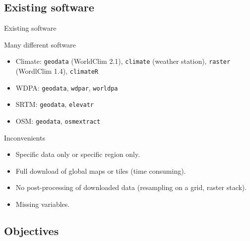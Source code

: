 \documentclass[10pt,table,dvipsnames,compress]{beamer}
\begin{document}
\subsection{Existing software}
\label{sec:org1319f94}

\begin{frame}[label={sec:orgff96910},fragile]{Existing software}
 \begin{block}{Many different software}
\begin{itemize}
\item Climate: \texttt{geodata} (WorldClim 2.1), \texttt{climate} (weather station), \texttt{raster} (WordlClim 1.4), \texttt{climateR}
\item WDPA: \texttt{geodata}, \texttt{wdpar}, \texttt{worldpa}
\item SRTM: \texttt{geodata}, \texttt{elevatr}
\item OSM: \texttt{geodata}, \texttt{osmextract}
\end{itemize}
\end{block}

\begin{block}{Inconvenients}
\begin{itemize}
\item Specific data only or specific region only.
\item Full download of global maps or tiles (time consuming).
\item No post-processing of downloaded data (resampling on a grid, raster stack).
\item Missing variables.
\end{itemize}
\end{block}
\end{frame}

\subsection{Objectives}
\label{sec:orgff6ac47}
\end{document}

